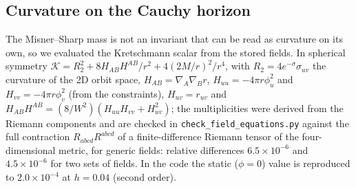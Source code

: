 \documentclass[11pt]{article}
\begin{document}
\subsection{Curvature on the Cauchy horizon}
\label{sec:curv}

The Misner--Sharp mass is not an invariant that can be read as curvature on its own, so we evaluated the Kretschmann scalar from the stored fields. In spherical symmetry $\mathcal K=R_2^2+8H_{AB}H^{AB}/r^2+4(2M/r)^2/r^4$, with $R_2=4e^{-\sigma}\sigma_{uv}$ the curvature of the 2D orbit space, $H_{AB}=\nabla_A\nabla_Br$, $H_{uu}=-4\pi r\phi_u^2$ and $H_{vv}=-4\pi r\phi_v^2$ (from the constraints), $H_{uv}=r_{uv}$ and $H_{AB}H^{AB}=(8/W^2)(H_{uu}H_{vv}+H_{uv}^2)$; the multiplicities were derived from the Riemann components and are checked in \texttt{check\_field\_equations.py} against the full contraction $R_{abcd}R^{abcd}$ of a finite-difference Riemann tensor of the four-dimensional metric, for generic fields: relative differences $6.5\times10^{-6}$ and $4.5\times10^{-6}$ for two sets of fields. In the code the static ($\phi=0$) value is reproduced to $2.0\times10^{-4}$ at $h=0.04$ (second order).
\end{document}
